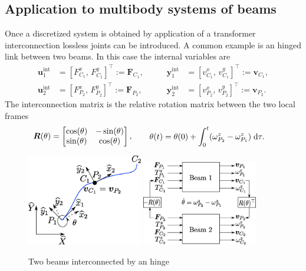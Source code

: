 \documentclass{svjour3}                     %
\begin{document}
\subsection{Application to multibody systems of beams}
\label{sec:int_beams}
Once a discretized system is obtained by application of a transformer interconnection lossless joints can be introduced. A common example is an hinged link between two beams. In this case the internal variables are
\begin{equation*}
\begin{aligned}
\bm{u}_1^{\text{int}} &= [F^x_{C_1}, \, F^y_{C_1}]^\top := \bm{F}_{C_1}, \\
\bm{u}_2^{\text{int}} &= [F^x_{P_2}, \, F^y_{P_2}]^\top := \bm{F}_{P_2},
\end{aligned} \qquad
\begin{aligned}
\bm{y}_1^{\text{int}} &= [v^x_{C_1}, \, v^y_{C_1}]^\top := \bm{v}_{C_1}, \\
\bm{y}_2^{\text{int}} &= [v^x_{P_2}, \, v^y_{P_2}]^\top := \bm{v}_{P_2}.
\end{aligned}
\end{equation*}
The interconnection matrix is the relative rotation matrix between the two local frames
\begin{equation}
\bm{R}(\theta) = \begin{bmatrix}
\cos(\theta) & - \sin(\theta) \\
\sin(\theta) & \cos(\theta) \\
\end{bmatrix}, \qquad 
\begin{aligned}
\theta(t) &= \theta(0) + \int_{0}^t (\omega^z_{P_2} - \omega^z_{P_1}) \d{\tau}.
\end{aligned}
\end{equation}

\begin{figure}[t]
	\centering
	\includegraphics[width=0.45\textwidth]{beam_int.eps} 
	\includegraphics[width=0.45\textwidth]{block_hinged_beam.eps} 
	\caption{Two beams interconnected by an hinge }
	\label{fig:beam_int}
\end{figure}
\end{document}
